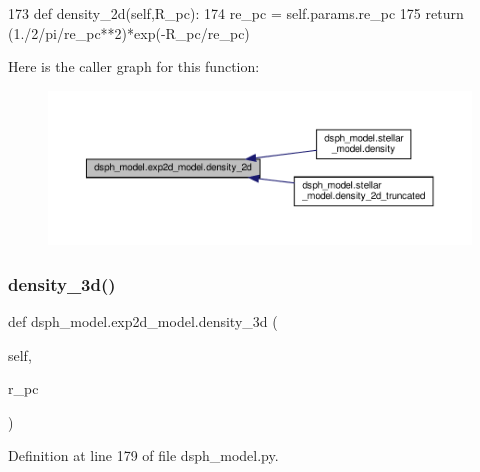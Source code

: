 \begin{DoxyCode}
173     \textcolor{keyword}{def }density\_2d(self,R\_pc):
174         re\_pc = self.params.re\_pc
175         \textcolor{keywordflow}{return} (1./2/pi/re\_pc**2)*exp(-R\_pc/re\_pc) 
\end{DoxyCode}
Here is the caller graph for this function\+:\nopagebreak
\begin{figure}[H]
\begin{center}
\leavevmode
\includegraphics[width=350pt]{df/d3d/classdsph__model_1_1exp2d__model_a41d0f3f53b8a31f9b64c71c733e7718e_icgraph}
\end{center}
\end{figure}
\mbox{\label{classdsph__model_1_1exp2d__model_a6736a23153473de1a3cba39c569f0aab}} 
\subsubsection{\texorpdfstring{density\+\_\+3d()}{density\_3d()}}
{\footnotesize\ttfamily def dsph\+\_\+model.\+exp2d\+\_\+model.\+density\+\_\+3d (\begin{DoxyParamCaption}\item[{}]{self,  }\item[{}]{r\+\_\+pc }\end{DoxyParamCaption})}



Definition at line 179 of file dsph\+\_\+model.\+py.


